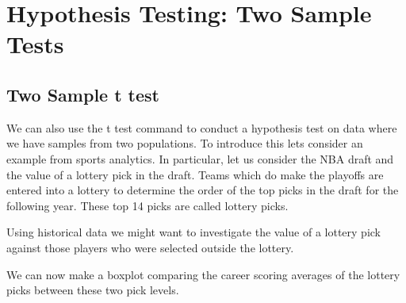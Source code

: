 \documentclass[
]{book}
\newenvironment{Shaded}{\begin{snugshade}}{\end{snugshade}}
\newcommand{\AttributeTok}[1]{\textcolor[rgb]{0.77,0.63,0.00}{#1}}
\newcommand{\DecValTok}[1]{\textcolor[rgb]{0.00,0.00,0.81}{#1}}
\newcommand{\DocumentationTok}[1]{\textcolor[rgb]{0.56,0.35,0.01}{\textbf{\textit{#1}}}}
\newcommand{\FunctionTok}[1]{\textcolor[rgb]{0.00,0.00,0.00}{#1}}
\newcommand{\NormalTok}[1]{#1}
\newcommand{\OtherTok}[1]{\textcolor[rgb]{0.56,0.35,0.01}{#1}}
\newcommand{\SpecialCharTok}[1]{\textcolor[rgb]{0.00,0.00,0.00}{#1}}
\newcommand{\StringTok}[1]{\textcolor[rgb]{0.31,0.60,0.02}{#1}}
\theoremstyle{definition}
\theoremstyle{definition}
\theoremstyle{definition}
\theoremstyle{definition}
\theoremstyle{remark}
\begin{document}
\hypertarget{hypothesis-testing-two-sample-tests}{%
\chapter{Hypothesis Testing: Two Sample Tests}\label{hypothesis-testing-two-sample-tests}}

\hypertarget{two-sample-t-test}{%
\section{Two Sample t test}\label{two-sample-t-test}}

We can also use the t test command to conduct a hypothesis test on data where we have samples from two populations. To introduce this lets consider an example from sports analytics. In particular, let us consider the NBA draft and the value of a lottery pick in the draft. Teams which do make the playoffs are entered into a lottery to determine the order of the top picks in the draft for the following year. These top 14 picks are called lottery picks.

Using historical data we might want to investigate the value of a lottery pick against those players who were selected outside the lottery.

\begin{Shaded}
\end{Shaded}

We can now make a boxplot comparing the career scoring averages of the lottery picks between these two pick levels.

\begin{Shaded}
\end{Shaded}
\end{document}
